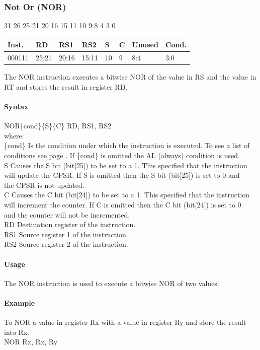 \documentclass[12pt]{article}
\newcommand{\aTypeInstruction}[6]
{%
    \hspace{1.6cm}31 \hspace{1.15cm}26 \hspace{.04cm}25 \hspace{.8cm}21 \hspace{.04cm}20 \hspace{.8cm}16 \hspace{.04cm}15 \hspace{.8cm}11 \hspace{.04cm}10 \hspace{.275cm}9 \hspace{.275cm}8 \hspace{1.175cm}4 \hspace{.04cm}3 \hspace{1.25cm}0
    \vspace{-.25cm}
    \begin{center}
        \begin{tabular}{ |p{1.8cm}|p{1.5cm}|p{1.5cm}|p{1.5cm}|p{0.3cm}|p{0.3cm}|p{1.5cm}|p{1.5cm}| }
            \hline
            \textbf{Inst.} & \textbf{RD}& \textbf{RS1} & \textbf{RS2} & \textbf{S} & \textbf{C} & Unused & \textbf{Cond.}\\
            \hline
            #1 & 25:21 & 20:16 & 15:11 & 10 & 9 & 8:4 &3:0\\
            \hline
        \end{tabular}
    \end{center}
    
    \noindent
    #2\\
    
    \paragraph{Syntax}
    \begin{flushleft}
    #3\{cond\}\{S\}\{C\} RD, RS1, RS2\\
    \vspace{1em}        %
    where:\\
    \vspace{1em}
    \{cond\}    \hspace{2em} Is the condition under which the instruction is executed. To see a list of\\
                \hspace{5.4em} conditions see page . If \{cond\} is omitted the AL (always) condition is used.\\
    \vspace{1em}    
    S       \hspace{4.5em} Causes the S bit (bit[25]) to be set to a 1. This specified that the instruction\\
            \hspace{5.4em} will update the CPSR. If S is omitted then the S bit (bit[25]) is set to 0 and\\
            \hspace{5.4em} the CPSR is not updated.\\
    \vspace{1em}    
    C       \hspace{4.5em} Causes the C bit (bit[24]) to be set to a 1. This specified that the instruction\\
            \hspace{5.4em} will increment the counter. If C is omitted then the C bit (bit[24]) is set to 0\\
            \hspace{5.4em} and the counter will not be incremented.\\
    \vspace{1em}
    RD  \hspace{3.6em} Destination register of the instruction.\\
    \vspace{1em}
    RS1  \hspace{3.35em} Source register 1 of the instruction.\\
    \vspace{1em}
    RS2  \hspace{3.35em} Source register 2 of the instruction.\\
    \end{flushleft}
    
    \paragraph{Usage}
    \begin{flushleft}
    #4\\
    \end{flushleft}
    \paragraph{Example}
    \begin{flushleft}
    #5\\
    \vspace{1em}
    #6
    \end{flushleft}
    }
\begin{document}
   
   




    \newpage
    \subsubsection{Not Or (NOR)}
    
    \aTypeInstruction
    {000111}
    {The NOR instruction executes a bitwise NOR of the value in RS and the value in RT and stores the result in register RD.}
    {NOR}
    {The NOR instruction is used to execute a bitwise NOR of two values.}
    {To NOR a value in register Rx with a value in register Ry and store the result into Rx.}
    {NOR Rx, Rx, Ry}
    
    
\end{document}
